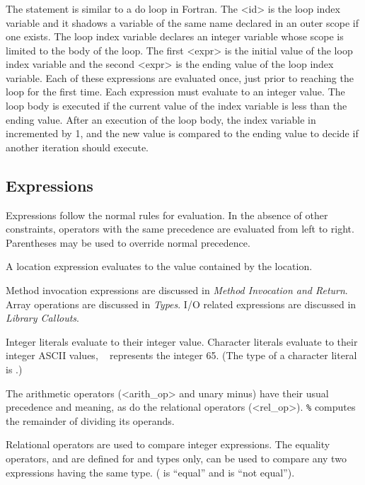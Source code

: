 \subsubsection*{}
The  statement is similar to a {\kw do} loop in Fortran.  The
{\bnf <id>} is the loop index variable and it shadows a variable of
the same name declared in an outer scope if one exists.  The loop
index variable declares an integer variable whose scope is limited to
the body of the loop.   The first {\bnf<expr>} is the initial value
of the loop index variable and the second {\bnf<expr>} is the ending
value of the loop index variable.  Each of these expressions are
evaluated once, just prior to reaching the loop for the first time.
Each expression must evaluate to an integer value.
The loop body is executed if the current value of the index variable
is less than the ending value.  After an execution of the
loop body, the index variable in incremented by 1, and the new value
is compared to the ending value to decide if another iteration should
execute.

\subsection*{Expressions}

Expressions follow the normal rules for evaluation.  In the absence of
other constraints, operators with the same precedence are evaluated from
left to right.  Parentheses may be used to override normal precedence.

A location expression evaluates to the value contained by the location.

Method invocation expressions are discussed in {\em Method Invocation
and Return}.  Array operations are discussed in {\em Types}.  I/O
related expressions are discussed in {\em Library Callouts}.

Integer literals evaluate to their integer value.  Character literals
evaluate to their integer ASCII values, \eg\  represents the
integer 65.  (The type of a character literal is .)

The arithmetic operators ({\bnf <arith_op>} and unary minus) have
their usual precedence and meaning, as do the relational operators
({\bnf <rel_op>}).  {\tt \%} computes the remainder of dividing its
operands. 


Relational operators are used to compare integer expressions.  The
equality operators, \term{==} and \term{!=} are defined for 
and  types only, can be used to compare any two
expressions having the same type.  (\term{==} is ``equal'' and
\term{!=} is ``not equal'').

